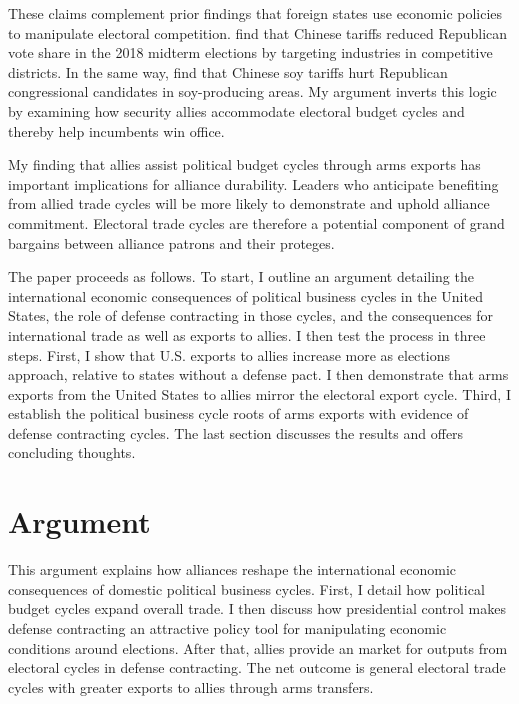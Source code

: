 \documentclass[12pt]{article}
\begin{document}
These claims complement prior findings that foreign states use economic policies to manipulate electoral competition. 
\citet{KimMargalit2021} find that Chinese tariffs reduced Republican vote share in the 2018 midterm elections by targeting industries in competitive districts.
In the same way, \cite{ChyzhUrbatsch2021} find that Chinese soy tariffs hurt Republican congressional candidates in soy-producing areas. 
My argument inverts this logic by examining how security allies accommodate electoral budget cycles and thereby help incumbents win office. 


My finding that allies assist political budget cycles through arms exports has important implications for alliance durability. 
Leaders who anticipate benefiting from allied trade cycles will be more likely to demonstrate and uphold alliance commitment. 
Electoral trade cycles are therefore a potential component of grand bargains between alliance patrons and their proteges. 


The paper proceeds as follows. 
To start, I outline an argument detailing the international economic consequences of political business cycles in the United States, the role of defense contracting in those cycles, and the consequences for international trade as well as exports to allies.
I then test the process in three steps. 
First, I show that U.S. exports to allies increase more as elections approach, relative to states without a defense pact. 
I then demonstrate that arms exports from the United States to allies mirror the electoral export cycle.
Third, I establish the political business cycle roots of arms exports with evidence of defense contracting cycles.
The last section discusses the results and offers concluding thoughts.


\section{Argument}


This argument explains how alliances reshape the international economic consequences of domestic political business cycles. 
First, I detail how political budget cycles expand overall trade.
I then discuss how presidential control makes defense contracting an attractive policy tool for manipulating economic conditions around elections. 
After that, allies provide an market for outputs from electoral cycles in defense contracting. 
The net outcome is general electoral trade cycles with greater exports to allies through arms transfers. 
\end{document}
